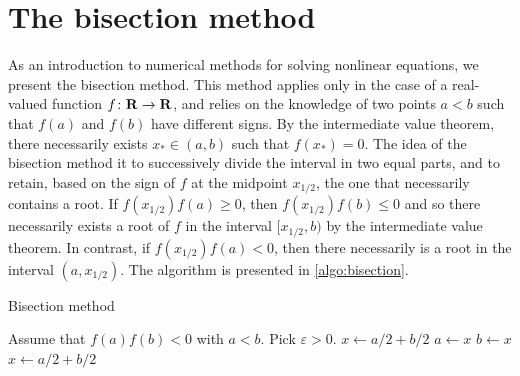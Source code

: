 \section{The bisection method}
\label{sec:bisection_method}
As an introduction to numerical methods for solving nonlinear equations,
we present the bisection method.
This method applies only in the case of a real-valued function $f\colon \mathbf R \to \mathbf R$,
and relies on the knowledge of two points $a < b$ such that $f(a)$ and $f(b)$ have different signs.
By the intermediate value theorem,
there necessarily exists $x_* \in (a, b)$ such that $f(x_*) = 0$.
The idea of the bisection method it to successively divide the interval in two equal parts,
and to retain, based on the sign of $f$ at the midpoint $x_{1/2}$,
the one that necessarily contains a root.
If $f(x_{1/2}) f(a) \geq 0$, then $f(x_{1/2}) f(b) \leq 0$ and so there necessarily exists a root of $f$ in the interval $[x_{1/2}, b)$ by the intermediate value theorem.
In contrast, if $f(x_{1/2}) f(a) < 0$, then there necessarily is a root in the interval $(a, x_{1/2})$.
The algorithm is presented in \cref{algo:bisection}.
\begin{algorithm}
\caption{Bisection method}%
\label{algo:bisection}%
\begin{algorithmic}
\State Assume that $f(a) f(b) < 0$ with $a < b$.
\State Pick $\varepsilon > 0$.
\State $x \gets a/2 + b/2$
        \State $a \gets x$
    \Else
        \State $b \gets x$
    \EndIf
    \State $x \gets a/2 + b/2$
\EndWhile
\end{algorithmic}
\end{algorithm}

